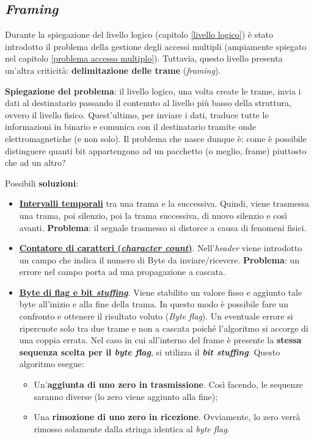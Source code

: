 \documentclass[a4paper]{article}
\begin{document}
	\subsection{\emph{Framing}}
	
	Durante la spiegazione del livello logico (capitolo \ref{livello logico}) è stato introdotto il problema della gestione degli accessi multipli (ampiamente spiegato nel capitolo \ref{problema accesso multiplo}). Tuttavia, questo livello presenta un'altra criticità: \textcolor{Red3}{\textbf{delimitazione delle trame} (\emph{framing})}.\newline
	
	\noindent
	\textbf{Spiegazione del problema}: il livello logico, una volta create le trame, invia i dati al destinatario passando il contenuto al livello più basso della struttura, ovvero il livello fisico. Quest'ultimo, per inviare i dati, traduce tutte le informazioni in binario e comunica con il destinatario tramite onde elettromagnetiche (e non solo). Il problema che nasce dunque è: come è possibile distinguere quanti bit appartengono ad un pacchetto (o meglio, frame) piuttosto che ad un altro?\newline
	
	\noindent
	Possibili \textbf{soluzioni}:
	\begin{itemize}
		\item \underline{\textbf{Intervalli temporali}} tra una trama e la successiva. Quindi, viene trasmessa una trama, poi silenzio, poi la trama successiva, di nuovo silenzio e così avanti.\newline
		\textbf{Problema}: il segnale trasmesso si distorce a causa di fenomeni fisici.
		
		\item \underline{\textbf{Contatore di caratteri (\emph{character count})}}. Nell'\emph{header} viene introdotto un campo che indica il numero di Byte da inviare/ricevere.\newline
		\textbf{Problema}: un errore nel campo porta ad una propagazione a cascata.
		
		\item \underline{\textbf{Byte di flag e bit \emph{stuffing}}}. Viene stabilito un valore fisso e aggiunto tale byte all'inizio e alla fine della trama. In questo modo è possibile fare un confronto e ottenere il risultato voluto (\emph{Byte flag}). Un eventuale errore si ripercuote solo tra due trame e non a cascata poiché l'algoritmo si accorge di una coppia errata.\newline
		Nel caso in cui all'interno del frame è presente la \textbf{stessa sequenza scelta per il \emph{byte flag}}, si utilizza il \textbf{\emph{bit stuffing}}. Questo algoritmo esegue:
		\begin{itemize}
			\item Un'\textbf{aggiunta di uno zero in trasmissione}. Così facendo, le sequenze saranno diverse (lo zero viene aggiunto alla fine);
			\item Una \textbf{rimozione di uno zero in ricezione}. Ovviamente, lo zero verrà rimosso solamente dalla stringa identica al \emph{byte flag}.
		\end{itemize}
	\end{itemize}
\end{document}
